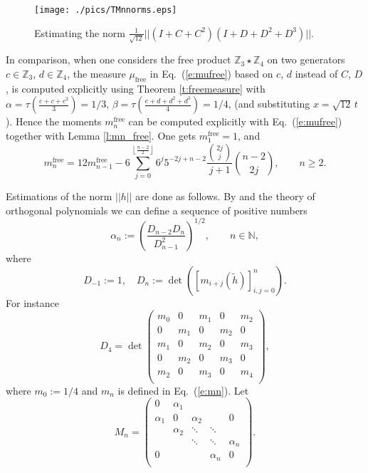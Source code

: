 \documentclass{amsart}
\newcommand{\N}{\mathbb N}
\newcommand{\Z}{\mathbb Z}
\theoremstyle{definition}
\begin{document}
\begin{figure}
  \texttt{[image: ./pics/TMnnorms.eps]}\\
  \caption{Estimating the norm $\frac{1}{\sqrt{12}}||(I+C+C^2)(I+D+D^2+D^3)||.$}\label{f:Mnnorms}
\end{figure}

In comparison, when one considers the free product $\Z_3\star \Z_4$ on two generators $c\in\Z_3$, $d\in \Z_4$,
the measure $\mu_{\text{free}}$ in Eq.~(\ref{e:mufree})  based on $c$, $d$ instead of $C$, $D$, is computed explicitly using Theorem \ref{t:freemeasure}
with $\alpha=\tau(\frac{e+c+c^2}3)=1/3$, $\beta=\tau(\frac{e+d+d^2+d^3}4)=1/4$, (and substituting $x=\sqrt{12}\,t$). Hence
the moments $m_n^{\text{free}}$ can be computed explicitly with Eq.~(\ref{e:mufree}) together with Lemma \ref{l:mn_free}.
One gets
$m^{\text{free}}_1=1$, and
$$ m^{\text{free}}_n=12 m^{\text{free}}_{n-1}-6\sum_{j=0}^{\left\lfloor \frac{n-2}{2}\right\rfloor} 
6^j  5^{-2 j+n-2}\frac{\binom{2 j}{j}}{j+1} \binom{n-2}{2 j}, \qquad n\ge2.
$$



Estimations of the norm $||h||$ are done as follows.
By \cite[Section 4]{HaagerupRamirezSolano} and the theory of orthogonal polynomials we can define a sequence of positive numbers 
$$\alpha_n:=\left(\frac{D_{n-2}D_n}{D_{n-1}^2}\right)^{1/2}, \qquad n\in\N,$$
where 
$$D_{-1}:=1,\quad D_n:=\det([m_{i+j}(\tilde h)]_{i,j=0}^n).$$
For instance $$D_4=\det\left(
\begin{array}{ccccc}
 m_0 & 0 & m_1 & 0 & m_2 \\
 0 & m_1 & 0 & m_2 & 0 \\
 m_1 & 0 & m_2 & 0 & m_3 \\
 0 & m_2 & 0 & m_3 & 0 \\
 m_2 & 0 & m_3 & 0 & m_4 \\
\end{array}
\right),$$
where $m_0:=1/4$ and $m_n$ is defined in Eq.~(\ref{e:mn}).
Let $$M_n=\left(
     \begin{array}{ccccc}
              0 & \alpha_1 &         &  & \\
       \alpha_1 & 0        & \alpha_2&  &0 \\
                & \alpha_2 & \ddots  & \ddots &\\
                &          &  \ddots & \ddots  &\alpha_n\\
       0        &          &         &\alpha_n & 0 \\
     \end{array}
   \right).$$
\end{document}
